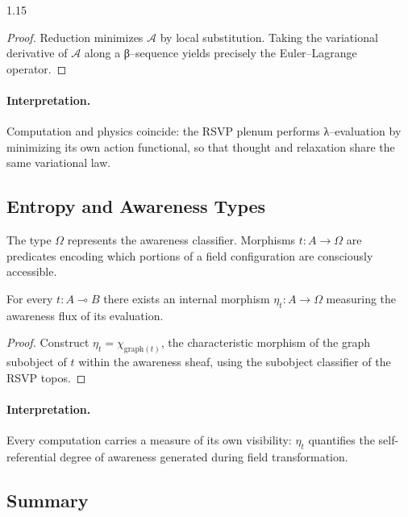 \documentclass[12pt,a4paper]{article}
\begin{document}
\begin{spacing}{1.15}
\begin{proof}
Reduction minimizes $\mathcal{A}$ by local substitution.
Taking the variational derivative of $\mathcal{A}$ along
a β–sequence yields precisely the Euler–Lagrange operator.
\end{proof}

\paragraph{Interpretation.}
Computation and physics coincide:
the RSVP plenum performs λ–evaluation
by minimizing its own action functional,
so that thought and relaxation share the same variational law.

\subsection{Entropy and Awareness Types}

\begin{definition}
\label{def:awaretype}
The type $\Omega$ represents the awareness classifier.
Morphisms $t:\!A\!\to\!\Omega$ are predicates encoding
which portions of a field configuration are consciously accessible.
\end{definition}

\begin{proposition}
\label{prop:introspect}
For every $t{:}A\multimap B$ there exists
an internal morphism $\eta_t{:}A\!\to\!\Omega$
measuring the awareness flux of its evaluation.
\end{proposition}

\begin{proof}
Construct $\eta_t = \chi_{\mathrm{graph}(t)}$,
the characteristic morphism of the graph subobject of $t$
within the awareness sheaf, using
the subobject classifier of the RSVP topos.
\end{proof}

\paragraph{Interpretation.}
Every computation carries a measure of its own visibility:
$\eta_t$ quantifies the self-referential degree of awareness
generated during field transformation.

\subsection{Summary}


\end{spacing}
\end{document}
